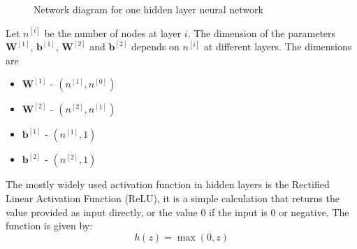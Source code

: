 \documentclass{beamer}
\begin{document}
\begin{frame}[allowframebreaks]
\begin{figure}[H]
\caption{Network diagram for one hidden layer neural network}
\label{fig:hidden}
\end{figure} 
Let $n^{[i]}$ be the number of nodes at layer $i$. The dimension of the parameters $\bm{W}^{[1]}$, $\bm{b}^{[1]}$, $\bm{W}^{[2]}$ and $\bm{b}^{[2]}$ depends on $n^{[i]}$ at different layers. The dimensions are 
\begin{multicols}{2}
\begin{itemize}[label=-]
\item $\bm{W}^{[1]}$ - $(n^{[1]},n^{[0]})$
\item $\bm{W}^{[2]}$ - $(n^{[2]},n^{[1]})$
\item $\bm{b}^{[1]}$ - $(n^{[1]},1)$
\item $\bm{b}^{[2]}$ - $(n^{[2]},1)$
\end{itemize}
\end{multicols}
The mostly widely used activation function in hidden layers is the Rectified Linear Activation Function (ReLU), it  is a simple calculation that returns the value provided as input directly, or the value $0$ if the input is $0$ or negative. The function is given by:
\begin{equation}\label{eqn:relu}
h(z) = \max(0,z)
\end{equation}
\begin{figure}[H]
\centering 

\end{figure}
\end{frame}
\end{document}
